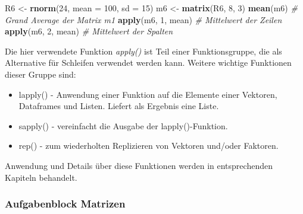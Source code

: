\documentclass[]{article}
\newenvironment{Shaded}{\begin{snugshade}}{\end{snugshade}}
\newcommand{\KeywordTok}[1]{\textcolor[rgb]{0.13,0.29,0.53}{\textbf{#1}}}
\newcommand{\DataTypeTok}[1]{\textcolor[rgb]{0.13,0.29,0.53}{#1}}
\newcommand{\DecValTok}[1]{\textcolor[rgb]{0.00,0.00,0.81}{#1}}
\newcommand{\StringTok}[1]{\textcolor[rgb]{0.31,0.60,0.02}{#1}}
\newcommand{\CommentTok}[1]{\textcolor[rgb]{0.56,0.35,0.01}{\textit{#1}}}
\newcommand{\NormalTok}[1]{#1}
\providecommand{\tightlist}{%
  \setlength{\itemsep}{0pt}\setlength{\parskip}{0pt}}
\begin{document}
\begin{Shaded}
\begin{Highlighting}[]
\NormalTok{    R6 <-}\StringTok{ }\KeywordTok{rnorm}\NormalTok{(}\DecValTok{24}\NormalTok{, }\DataTypeTok{mean =} \DecValTok{100}\NormalTok{, }\DataTypeTok{sd =} \DecValTok{15}\NormalTok{)}
\NormalTok{    m6 <-}\StringTok{ }\KeywordTok{matrix}\NormalTok{(R6, }\DecValTok{8}\NormalTok{, }\DecValTok{3}\NormalTok{)}
    \KeywordTok{mean}\NormalTok{(m6)           }\CommentTok{# Grand Average der Matrix m1}
    \KeywordTok{apply}\NormalTok{(m6, }\DecValTok{1}\NormalTok{, mean) }\CommentTok{# Mittelwert der Zeilen}
    \KeywordTok{apply}\NormalTok{(m6, }\DecValTok{2}\NormalTok{, mean) }\CommentTok{# Mittelwert der Spalten}
\end{Highlighting}
\end{Shaded}

Die hier verwendete Funktion \emph{apply()} ist Teil einer
Funktionsgruppe, die als Alternative für Schleifen verwendet werden
kann. Weitere wichtige Funktionen dieser Gruppe sind:

\begin{itemize}
\tightlist
\item
  lapply() - Anwendung einer Funktion auf die Elemente einer Vektoren,
  Dataframes und Listen. Liefert als Ergebnis eine Liste.
\item
  sapply() - vereinfacht die Ausgabe der lapply()-Funktion.
\item
  rep() - zum wiederholten Replizieren von Vektoren und/oder Faktoren.
\end{itemize}

Anwendung und Details über diese Funktionen werden in entsprechenden
Kapiteln behandelt.

\subsubsection*{Aufgabenblock Matrizen}\label{aufgabenblock-matrizen}
\end{document}
